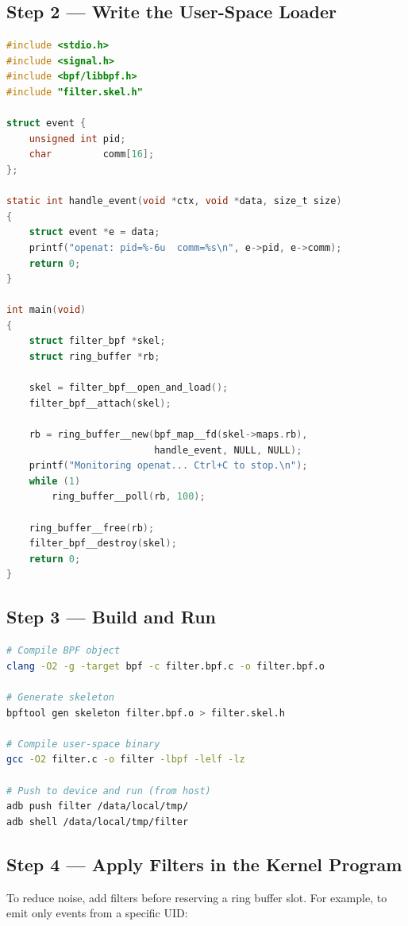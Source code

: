 \documentclass{mnitjaipur}
\begin{document}
\subsection{Step 2 --- Write the User-Space Loader}

\begin{lstlisting}[language=C,caption={User-space loader for the openat filter (filter.c)}]
#include <stdio.h>
#include <signal.h>
#include <bpf/libbpf.h>
#include "filter.skel.h"

struct event {
    unsigned int pid;
    char         comm[16];
};

static int handle_event(void *ctx, void *data, size_t size)
{
    struct event *e = data;
    printf("openat: pid=%-6u  comm=%s\n", e->pid, e->comm);
    return 0;
}

int main(void)
{
    struct filter_bpf *skel;
    struct ring_buffer *rb;

    skel = filter_bpf__open_and_load();
    filter_bpf__attach(skel);

    rb = ring_buffer__new(bpf_map__fd(skel->maps.rb),
                          handle_event, NULL, NULL);
    printf("Monitoring openat... Ctrl+C to stop.\n");
    while (1)
        ring_buffer__poll(rb, 100);

    ring_buffer__free(rb);
    filter_bpf__destroy(skel);
    return 0;
}
\end{lstlisting}

\subsection{Step 3 --- Build and Run}

\begin{lstlisting}[language=bash]
# Compile BPF object
clang -O2 -g -target bpf -c filter.bpf.c -o filter.bpf.o

# Generate skeleton
bpftool gen skeleton filter.bpf.o > filter.skel.h

# Compile user-space binary
gcc -O2 filter.c -o filter -lbpf -lelf -lz

# Push to device and run (from host)
adb push filter /data/local/tmp/
adb shell /data/local/tmp/filter
\end{lstlisting}

\subsection{Step 4 --- Apply Filters in the Kernel Program}

To reduce noise, add filters before reserving a ring buffer slot. For example, to emit only events from a specific UID:
\end{document}
